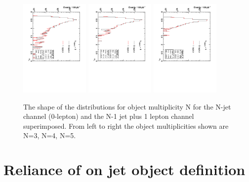 \begin{figure}
\centering
\includegraphics[width=0.3\textwidth, angle=90]{Figures/AlphaT/aT_3}
\includegraphics[width=0.3\textwidth,angle=90]{Figures/AlphaT/aT_4}
\includegraphics[width=0.3\textwidth,angle=90]{Figures/AlphaT/aT_5}
\caption{\label{fig:aTnobj}The shape of the \alt distributions for object multiplicity N for the N-jet channel (0-lepton) and the N-1 jet plus 1 lepton channel superimposed. From left to right the object multiplicities shown are N=3, N=4, N=5.}
\end{figure}

\section{Reliance of \alt on jet object definition}

